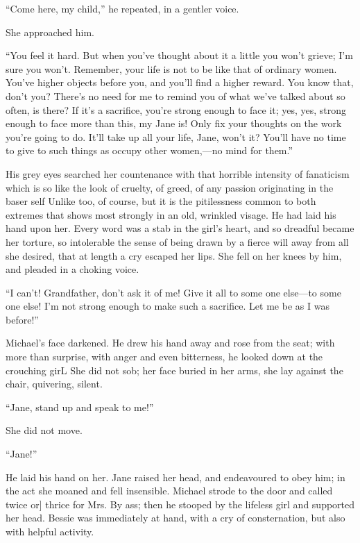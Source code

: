 ``Come here, my child,'' he repeated, in a gentler voice.

She approached him.

``You feel it hard. But when you've thought about it a little you won't
grieve; I'm sure you won't. Remember, your life is not to be like that
of ordinary women. You've higher objects before you, and you'll find a
higher reward. You know that, don't you? There's no need for me to
remind you of what we've talked about so often, is there? If it's
{\protect\hypertarget{132}{}{}}a sacrifice, you're strong enough to face
it; yes, yes, strong enough to face more than this, my Jane is! Only fix
your thoughts on the work you're going to do. It'll take up all your
life, Jane, won't it? You'll have no time to give to such things as
occupy other women,---no mind for them.''

His grey eyes searched her countenance with that horrible intensity of
fanaticism which is so like the look of cruelty, of greed, of any
passion originating in the baser self Unlike too, of course, but it is
the pitilessness common to both extremes that shows most strongly in an
old, wrinkled visage. He had laid his hand upon her. Every word was a
stab in the girl's heart, and so dreadful became her torture, so
intolerable the sense of being drawn by a fierce will away from all she
desired, that at length a cry escaped her lips. She fell on her knees by
him, and pleaded in a choking voice.

``I can't! Grandfather, don't ask it of me! Give it all to some one
else---to some one else! I'm not strong enough to make such a sacrifice.
Let me be as I was before!''

Michael's face darkened. He drew his hand away and rose from the seat;
with more than {\protect\hypertarget{133}{}{}}surprise, with anger and
even bitterness, he looked down at the crouching girL She did not sob;
her face buried in her arms, she lay against the chair, quivering,
silent.

``Jane, stand up and speak to me!''

She did not move.

``Jane!''

He laid his hand on her. Jane raised her head, and endeavoured to obey
him; in the act she moaned and fell insensible. Michael strode to the
door and called twice or{]} thrice for Mrs. By ass; then he stooped by
the lifeless girl and supported her head. Bessie was immediately at
hand, with a cry of consternation, but also with helpful activity.

